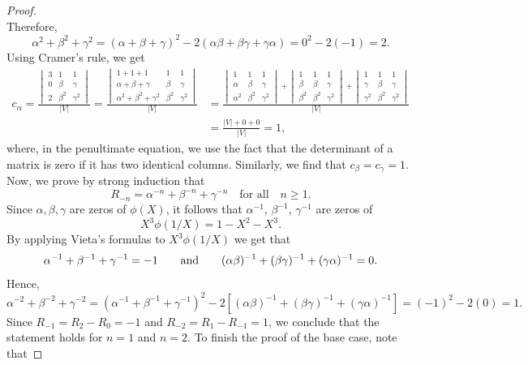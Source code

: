 \documentclass[11pt,a4paper]{article}
\numberwithin{equation}{section}
\numberwithin{table}{section}
\numberwithin{figure}{section}
\begin{document}
\begin{proof}
$$$$ 
Therefore, 
$$
\alpha^{2}+\beta^{2}+\gamma^{2}=(\alpha +\beta +\gamma)^{2}-2( \alpha \beta +\beta \gamma + \gamma \alpha)=0^{2}-2(-1)=2.
$$ 
Using Cramer's rule, we get
\begin{align*}
c_{\alpha}=\frac{\begin{vmatrix}3&1&1\\ 0 &\beta &\gamma \\ 2 & \beta^{2} &\gamma^{2}\end{vmatrix}}{|V|}=\frac{\begin{vmatrix}1+1+1&1&1\\ \alpha +\beta +\gamma &\beta &\gamma \\ \alpha^{2}+\beta^{2}+\gamma^{2} & \beta^{2} &\gamma^{2}\end{vmatrix}}{|V|}&=\frac{\begin{vmatrix}1&1&1\\  \alpha &\beta &\gamma \\ \alpha^{2} & \beta^{2} &\gamma^{2}\end{vmatrix}+\begin{vmatrix}1&1&1\\  \beta &\beta &\gamma \\ \beta^{2} & \beta^{2} &\gamma^{2}\end{vmatrix}+\begin{vmatrix}1&1&1\\  \gamma &\beta &\gamma \\ \gamma^{2} & \beta^{2} &\gamma^{2}\end{vmatrix}}{|V|}\\
&=\frac{|V|+0+0}{|V|}=1,
\end{align*}
where, in the penultimate equation, we use the fact that the determinant of a matrix is zero if it has two identical columns. Similarly, we find that $c_{\beta}=c_{\gamma}=1$. Now, we prove by strong induction that
$$
R_{-n}=\alpha^{-n}+\beta^{-n}+\gamma^{-n}\quad \text{for all}\quad n\ge 1.
$$
Since $\alpha,\beta, \gamma$ are zeros of $\phi(X)$, it follows that $\alpha^{-1}$, $\beta^{-1}$, $\gamma^{-1}$ are zeros of 
$$
X^{3}\phi(1/X)=1-X^{2}-X^{3}.
$$ 
By applying Vieta's formulas to $X^{3}\phi(1/X)$ we get that 
$$
\alpha^{-1}+\beta^{-1}+\gamma^{-1}=-1\qquad {\text{\rm and}}\qquad (\alpha \beta)^{-1}+(\beta \gamma)^{-1}+(\gamma \alpha)^{-1}=0.
$$ 
Hence, 
$$
\alpha^{-2}+\beta^{-2}+\gamma^{-2}=(\alpha^{-1}+\beta^{-1}+\gamma^{-1})^{2}-2[(\alpha \beta)^{-1}+(\beta \gamma)^{-1}+(\gamma \alpha)^{-1}]=(-1)^{2}-2(0)=1.
$$ 
Since $R_{-1}=R_{2}-R_{0}=-1$ and $R_{-2}=R_{1}-R_{-1}=1$, we conclude that the statement holds for $n=1$ and $n=2$. To finish the proof of the base case, note that

\end{proof}
\end{document}
